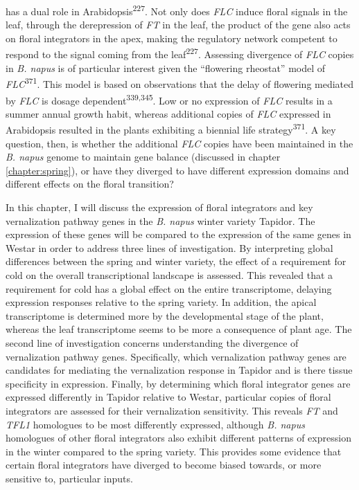 \documentclass[12pt,]{book}
\begin{document}
has a dual role in Arabidopsis\textsuperscript{227}. Not only does
\emph{FLC} induce floral signals in the leaf, through the derepression
of \emph{FT} in the leaf, the product of the gene also acts on floral
integrators in the apex, making the regulatory network competent to
respond to the signal coming from the leaf\textsuperscript{227}.
Assessing divergence of \emph{FLC} copies in \emph{B. napus} is of
particular interest given the ``flowering rheostat'' model of
\emph{FLC}\textsuperscript{371}. This model is based on observations
that the delay of flowering mediated by \emph{FLC} is dosage
dependent\textsuperscript{339,345}. Low or no expression of \emph{FLC}
results in a summer annual growth habit, whereas additional copies of
\emph{FLC} expressed in Arabidopsis resulted in the plants exhibiting a
biennial life strategy\textsuperscript{371}. A key question, then, is
whether the additional \emph{FLC} copies have been maintained in the
\emph{B. napus} genome to maintain gene balance (discussed in chapter
\ref{chapter:spring}), or have they diverged to have different
expression domains and different effects on the floral transition?

In this chapter, I will discuss the expression of floral integrators and
key vernalization pathway genes in the \emph{B. napus} winter variety
Tapidor. The expression of these genes will be compared to the
expression of the same genes in Westar in order to address three lines
of investigation. By interpreting global differences between the spring
and winter variety, the effect of a requirement for cold on the overall
transcriptional landscape is assessed. This revealed that a requirement
for cold has a global effect on the entire transcriptome, delaying
expression responses relative to the spring variety. In addition, the
apical transcriptome is determined more by the developmental stage of
the plant, whereas the leaf transcriptome seems to be more a consequence
of plant age. The second line of investigation concerns understanding
the divergence of vernalization pathway genes. Specifically, which
vernalization pathway genes are candidates for mediating the
vernalization response in Tapidor and is there tissue specificity in
expression. Finally, by determining which floral integrator genes are
expressed differently in Tapidor relative to Westar, particular copies
of floral integrators are assessed for their vernalization sensitivity.
This reveals \emph{FT} and \emph{TFL1} homologues to be most differently
expressed, although \emph{B. napus} homologues of other floral
integrators also exhibit different patterns of expression in the winter
compared to the spring variety. This provides some evidence that certain
floral integrators have diverged to become biased towards, or more
sensitive to, particular inputs.
\end{document}
